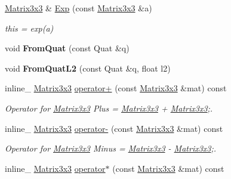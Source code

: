 \begin{DoxyCompactItemize}
\item 
\hyperlink{classMatrix3x3}{Matrix3x3} \& \hyperlink{classMatrix3x3_a89f097e8a6c046d9b2a7c364f9a6dfbe}{Exp} (const \hyperlink{classMatrix3x3}{Matrix3x3} \&a)\hypertarget{classMatrix3x3_a89f097e8a6c046d9b2a7c364f9a6dfbe}{}\label{classMatrix3x3_a89f097e8a6c046d9b2a7c364f9a6dfbe}

\begin{DoxyCompactList}\small\item\em this = exp(a) \end{DoxyCompactList}\item 
void {\bfseries From\+Quat} (const Quat \&q)\hypertarget{classMatrix3x3_a89ea8a63ebc11e945fafdd9c761dcbb3}{}\label{classMatrix3x3_a89ea8a63ebc11e945fafdd9c761dcbb3}

\item 
void {\bfseries From\+Quat\+L2} (const Quat \&q, float l2)\hypertarget{classMatrix3x3_a9b951696a009332ac91d8ec6c5097dc3}{}\label{classMatrix3x3_a9b951696a009332ac91d8ec6c5097dc3}

\item 
inline\+\_\+ \hyperlink{classMatrix3x3}{Matrix3x3} \hyperlink{classMatrix3x3_a90ffab5eff83c9f3a65552a84d85b316}{operator+} (const \hyperlink{classMatrix3x3}{Matrix3x3} \&mat) const \hypertarget{classMatrix3x3_a90ffab5eff83c9f3a65552a84d85b316}{}\label{classMatrix3x3_a90ffab5eff83c9f3a65552a84d85b316}

\begin{DoxyCompactList}\small\item\em Operator for \hyperlink{classMatrix3x3}{Matrix3x3} Plus = \hyperlink{classMatrix3x3}{Matrix3x3} + \hyperlink{classMatrix3x3}{Matrix3x3};. \end{DoxyCompactList}\item 
inline\+\_\+ \hyperlink{classMatrix3x3}{Matrix3x3} \hyperlink{classMatrix3x3_a8e29e6a7f65275594aec4fb1f542f2ba}{operator-\/} (const \hyperlink{classMatrix3x3}{Matrix3x3} \&mat) const \hypertarget{classMatrix3x3_a8e29e6a7f65275594aec4fb1f542f2ba}{}\label{classMatrix3x3_a8e29e6a7f65275594aec4fb1f542f2ba}

\begin{DoxyCompactList}\small\item\em Operator for \hyperlink{classMatrix3x3}{Matrix3x3} Minus = \hyperlink{classMatrix3x3}{Matrix3x3} -\/ \hyperlink{classMatrix3x3}{Matrix3x3};. \end{DoxyCompactList}\item 
inline\+\_\+ \hyperlink{classMatrix3x3}{Matrix3x3} \hyperlink{classMatrix3x3_a5986f5b597c6cb501ff839f54ed8a701}{operator$\ast$} (const \hyperlink{classMatrix3x3}{Matrix3x3} \&mat) const \hypertarget{classMatrix3x3_a5986f5b597c6cb501ff839f54ed8a701}{}\label{classMatrix3x3_a5986f5b597c6cb501ff839f54ed8a701}


\end{DoxyCompactItemize}
